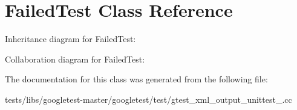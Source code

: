 \hypertarget{classFailedTest}{}\section{Failed\+Test Class Reference}
\label{classFailedTest}


Inheritance diagram for Failed\+Test\+:


Collaboration diagram for Failed\+Test\+:


The documentation for this class was generated from the following file\+:\begin{DoxyCompactItemize}
\item 
tests/libs/googletest-\/master/googletest/test/gtest\+\_\+xml\+\_\+output\+\_\+unittest\+\_\+.\+cc\end{DoxyCompactItemize}
